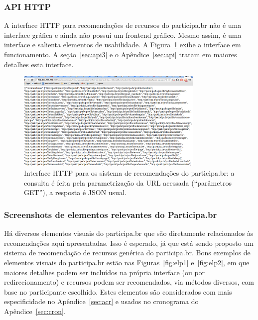 \documentclass[12pt]{article}
\begin{document}
\subsubsection{API HTTP}\label{sec:api2}
A interface HTTP para recomendações de recursos do participa.br não é uma interface gráfica e ainda não possui um frontend gráfico. Mesmo assim, é uma interface e salienta elementos de usabilidade. A Figura~\ref{fig:api} exibe a interface em funcionamento. A seção~\ref{sec:api3} e o Apêndice~\ref{sec:api} tratam em maiores detalhes esta interface.
\begin{figure}[h!]
  \centering
      \includegraphics[width=0.8\textwidth]{screenshots/api}
  \caption{Interface HTTP para os sistema de recomendações do participa.br: a consulta é feita pela parametrização da URL acessada (``parâmetros GET''), a resposta é JSON usual.}\label{fig:api}
\end{figure}

\subsubsection{Screenshots de elementos relevantes do Participa.br}
Há diversos elementos visuais do participa.br que são diretamente relacionados às recomendações aqui apresentadas. Isso é esperado, já que está sendo proposto um sistema de recomendação de recursos genérica do participa.br. Bons exemplos de elementos visuais do participa.br estão nas Figuras~\ref{fig:elp1} e~\ref{fig:elp2}, em que maiores detalhes podem ser incluídos na própria interface (ou por redirecionamento) e recursos podem ser recomendados, via métodos diversos, com base no participante escolhido. Estes elementos são considerados com mais especificidade no Apêndice~\ref{sec:acr} e usados no cronograma do Apêndice~\ref{sec:cron}.
\end{document}

